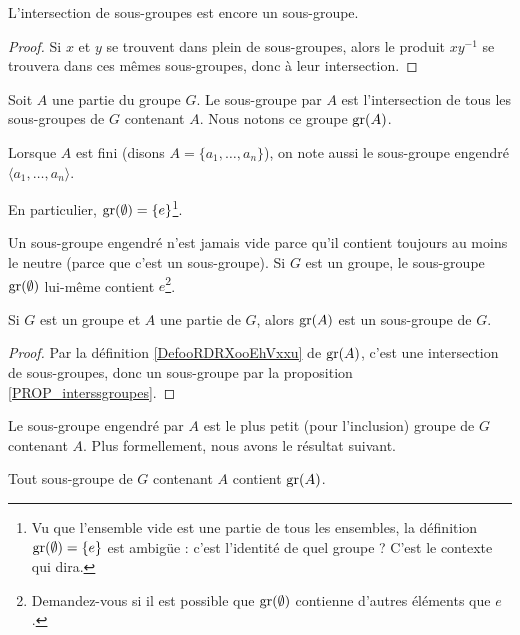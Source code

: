 \begin{proposition}    \label{PROP_interssgroupes}
L'intersection de sous-groupes est encore un sous-groupe.
\end{proposition}
\begin{proof}
Si \( x \) et \( y \) se trouvent dans plein de sous-groupes, alors le produit \( xy^{-1} \) se trouvera dans ces mêmes sous-groupes, donc à leur intersection.
\end{proof}

\begin{definition}        \label{DefooRDRXooEhVxxu}
    Soit \( A\) une partie du groupe \( G\). Le sous-groupe  par \( A\) est l'intersection de tous les sous-groupes de \( G\) contenant \( A\). Nous notons ce groupe \( \operatorname{gr}(A)\).

    Lorsque \( A \) est fini (disons \( A = \{a_1, \dots, a_n\} \)), on note aussi le sous-groupe engendré \( \langle a_1, \dots, a_n \rangle \).

    En particulier, \( \operatorname{gr}(\emptyset)=\{ e \}\)\footnote{Vu que l'ensemble vide est une partie de tous les ensembles, la définition \( \operatorname{gr}(\emptyset)=\{ e \}\) est ambigüe : c'est l'identité de quel groupe ? C'est le contexte qui dira.}.
\end{definition}

Un sous-groupe engendré n'est jamais vide parce qu'il contient toujours au moins le neutre (parce que c'est un sous-groupe). Si \( G\) est un groupe, le sous-groupe \( \operatorname{gr}(\emptyset)\) lui-même contient \( e\)\footnote{Demandez-vous si il est possible que \( \operatorname{gr}(\emptyset)\) contienne d'autres éléments que \( e\).}.

\begin{lemma}
    Si \( G\) est un groupe et \( A\) une partie de \( G\), alors \( \operatorname{gr}(A)\) est un sous-groupe de \( G\).
\end{lemma}
\begin{proof}
   Par la définition \ref{DefooRDRXooEhVxxu} de \( \operatorname{gr}(A)\), c'est une intersection de sous-groupes, donc un sous-groupe par la proposition \ref{PROP_interssgroupes}.
\end{proof}

Le sous-groupe engendré par \( A \) est le plus petit (pour l'inclusion) groupe de \( G\) contenant \( A\). Plus formellement, nous avons le résultat suivant.
\begin{lemma}     \label{LEM_contenancedussgrengendre}
    Tout sous-groupe de \( G\) contenant \( A\) contient \( \operatorname{gr}(A)\).
\end{lemma}

